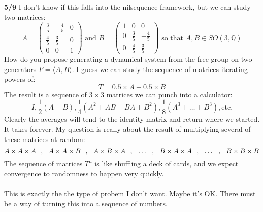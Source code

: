 \documentclass[12pt]{article}
\begin{document}
\newpage

\noindent \textbf{5/9} I don't know if this falls into the nilsequence framework, but we can study two matrices:
$$ A = \left( \begin{array}{crc} \frac{3}{5} & -\frac{4}{5} & 0 \\
 \frac{4}{5} & \frac{3}{5} & 0 \\
 0 & 0 & 1  \end{array} \right) 
 \text{ and }  B = \left( \begin{array}{ccr} 
 1 & 0 & 0 \\
0 &  \frac{3}{5} & -\frac{4}{5} \\
0 & \frac{4}{5} & \frac{3}{5}  \end{array} \right) \text{ so that }A,B \in SO(3, \mathbb{Q})$$
How do you propose generating a dynamical system from the free group on two generators $F = \langle A, B \rangle$.  I guess we can study the sequence of matrices iterating powers of:
$$ T = 0.5 \times  A + 0.5  \times B $$
The result is a sequence of $3 \times 3$ matrices we can punch into a calculator:
$$ I,  \frac{1}{2}(A+B), \frac{1}{4}(A^2 + AB + BA + B^2), \frac{1}{8}(A^3 + \dots + B^3), \text{etc.} $$
Clearly the averages will tend to the identity matrix and return where we started.  It takes forever.  My question is really about the result of multiplying several of these matrices at random:
$$ A \times A \times A\hspace{0.1in},\hspace{0.1in} A \times A \times B\hspace{0.1in},\hspace{0.1in} A \times B \times A\hspace{0.1in},\hspace{0.1in} \dots \hspace{0.1in},\hspace{0.1in} B \times A \times A\hspace{0.1in},\hspace{0.1in} \dots \hspace{0.1in},\hspace{0.1in} B \times B \times B $$
The sequence of matrices $T^n$ is like shuffling a deck of cards, and we expect convergence to randomness to happen very quickly.  \\ \\
This is exactly the the type of probem I don't want.   Maybe it's OK.  There must be a way of turning this into a sequence of numbers.  \\ \\
\end{document}
